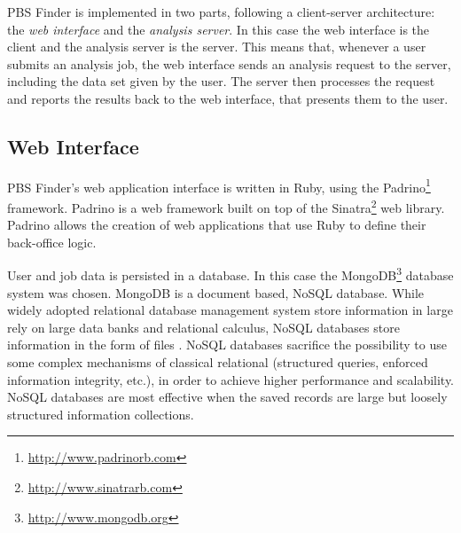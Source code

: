 
PBS Finder is implemented in two parts, following a client-server architecture:
the \emph{web interface} and the \emph{analysis server}. In this case the web
interface is the client and the analysis server is the server. This means that,
whenever a user submits an analysis job, the web interface sends an analysis
request to the server, including the data set given by the user. The server then
processes the request and reports the results back to the web interface, that
presents them to the user.

\subsection{Web Interface}

PBS Finder's web application interface is written in Ruby, using the
Padrino\footnote{\url{http://www.padrinorb.com}} framework. Padrino is a web
framework built on top of the Sinatra\footnote{\url{http://www.sinatrarb.com}}
web library. Padrino allows the creation of web applications that use Ruby to
define their back-office logic.

User and job data is persisted in a database. In this case the
MongoDB\footnote{\url{http://www.mongodb.org}} database system was chosen.
MongoDB is a document based, NoSQL database. While widely adopted relational
database management system store information in large rely on large data banks
and relational calculus, NoSQL databases store information in the form of files
\cite{strauch2011nosql}. NoSQL databases sacrifice the possibility to use some
complex mechanisms of classical relational (structured queries, enforced
information integrity, etc.), in order to achieve higher performance and
scalability. NoSQL databases are most effective when the saved records are large
but loosely structured information collections.

